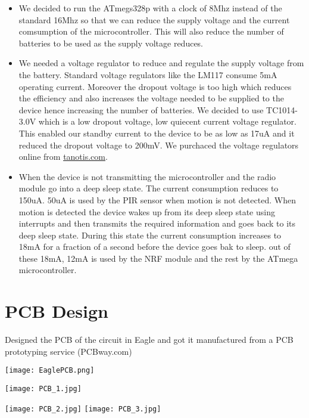 \begin{itemize}
\item We decided to run the ATmegs328p with a clock of 8Mhz instead of the standard 16Mhz so that we can reduce the supply voltage and the current comsumption of the microcontroller. This will also reduce the number of batteries to be used as the supply voltage reduces.
\item We needed a voltage regulator to reduce and regulate the supply voltage from the battery. Standard voltage regulators like the LM117 consume 5mA operating current. Moreover the dropout voltage is too high which reduces the efficiency and also increases the voltage needed to be supplied to the device hence increasing the number of batteries.
We decided to use TC1014-3.0V which is a low dropout voltage, low quiecent current voltage regulator. This enabled our standby current to the device to be as low as 17uA and it reduced the dropout voltage to 200mV.
We purchaced the voltage regulators online from \url{tanotis.com}.
\item When the device is not transmitting the microcontroller and the radio module go into a deep sleep state. The current consumption reduces to 150uA. 50uA is used by the PIR sensor when motion is not detected. 
When motion is detected the device wakes up from its deep sleep state using interrupts and then transmits the required information and goes back to its deep sleep state. During this state the current consumption increases to 18mA for a fraction of a second before the device goes bak to sleep. out of these 18mA, 12mA is used by the NRF module and the rest by the ATmega microcontroller.
\end{itemize}

\section{PCB Design}

Designed the PCB of the circuit in Eagle and got it manufactured from a PCB prototyping service (PCBway.com)

\texttt{[image: EaglePCB.png]}

\texttt{[image: PCB\_1.jpg]}

\texttt{[image: PCB\_2.jpg]}
\texttt{[image: PCB\_3.jpg]}

